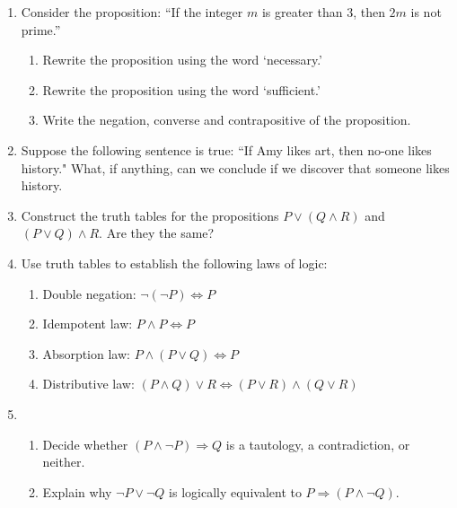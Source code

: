 \begin{exercises}{}{}
\begin{enumerate}
  
	  \item Consider the proposition: ``If the integer $m$ is greater than 3, then $2m$ is not prime.''
	  \begin{enumerate}
	    \item Rewrite the proposition using the word `necessary.'
	    
	 		\item Rewrite the proposition using the word  `sufficient.'
	 		
	 		\item Write the negation, converse and contrapositive of the proposition. 
	  \end{enumerate}
	  

  	\item Suppose the following sentence is true: ``If Amy likes art, then no-one likes history." What, if anything, can we conclude if we discover that someone likes history.
  
  
  	\goodbreak
	  
	  
	  \item Construct the truth tables for the propositions $P\vee(Q\wedge R)$ and $(P\vee Q)\wedge R$. Are they the same?
   
   
  	\goodbreak
  
  
		\item Use truth tables to establish the following laws of logic:
		\begin{enumerate}
		  \item Double negation: \lstsp $\neg(\neg P)\Longleftrightarrow P$
		  
		  \item Idempotent law: \lstsp $P\wedge P\Longleftrightarrow P$
		  
		  \item Absorption law: \lstsp $P\wedge(P\vee Q)\Longleftrightarrow P$
		  
		  \item Distributive law: \lstsp $(P\wedge Q)\vee R\Longleftrightarrow (P\vee R)\wedge(Q\vee R)$
		\end{enumerate}
  
  
	  \item\begin{enumerate}
	    \item Decide whether $(P\wedge \neg P) \Longrightarrow Q$ is a tautology, a contradiction, or neither.
	    
	    \item Explain why $\neg P \vee \neg Q$ is logically equivalent to $P \Longrightarrow (P \wedge\neg Q)$.
	    

\end{enumerate}
\end{enumerate}
\end{exercises}
